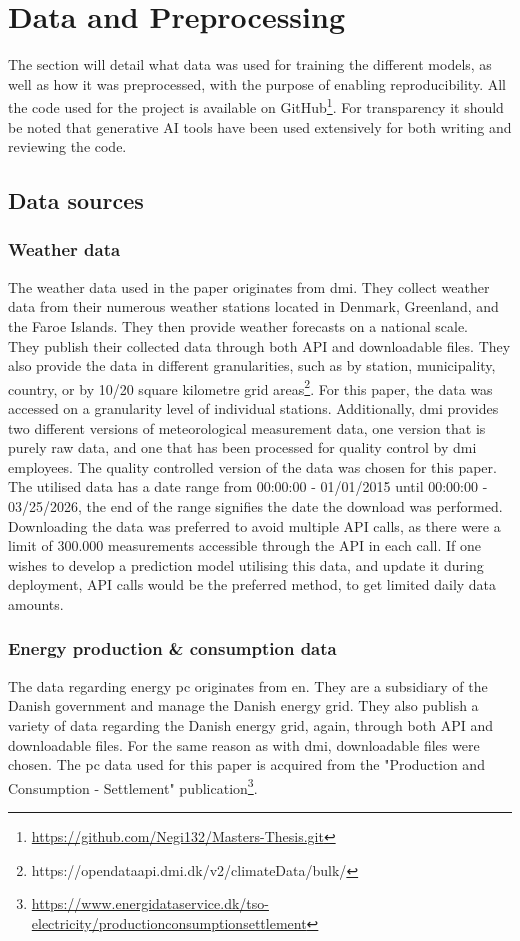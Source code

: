 \section{Data and Preprocessing}\label{sec:data_preprocessing}
The section will detail what data was used for training the different models, 
as well as how it was preprocessed, with the purpose of enabling 
reproducibility. All the code used for the project is available on 
GitHub\footnote{\url{https://github.com/Negi132/Masters-Thesis.git}}.
 For transparency it should be noted that 
generative AI tools have been used extensively for both writing and reviewing 
the code. 
\subsection{Data sources}\label{sec:data_sources}
\subsubsection{Weather data}
The weather data used in the paper originates from \gls{dmi}. They collect 
weather data from their numerous weather stations located in Denmark, 
Greenland, and the Faroe Islands. They then provide weather forecasts on a 
national scale. \\
They publish their collected data through both API and downloadable files. They 
also provide the data in different granularities, such as by station, 
municipality, country, or by 10/20 square kilometre grid 
areas\footnote{https://opendataapi.dmi.dk/v2/climateData/bulk/}. For this 
paper, the data was accessed on a granularity level of individual stations. 
Additionally, \gls{dmi} provides two different versions of meteorological 
measurement data, one 
version that is purely raw data, and one that has been processed for quality 
control by \gls{dmi} employees. The quality controlled version of the data was 
chosen for this paper. The utilised data has a 
date range from 00:00:00 - 
01/01/2015 until 00:00:00 - 
03/25/2026, the end of the range signifies the date the download was performed. 
Downloading the data was preferred to avoid multiple API calls, as there were a 
limit of $300.000$ measurements accessible through the API in each call. If one 
wishes to develop a prediction model utilising 
this data, and update it during 
deployment, API calls would be the preferred method, to get limited daily data 
amounts. 

\subsubsection{Energy production \& consumption data}
The data regarding energy \gls{pc} originates from 
\gls{en}. They are a subsidiary of the Danish 
government and manage the Danish 
energy grid. They also publish a variety of data 
regarding the Danish energy 
grid, again, through both API and downloadable files. For the same reason as 
with \gls{dmi}, downloadable files were chosen. The \gls{pc} data used for this 
paper is acquired from the "Production and Consumption - Settlement" 
publication\footnote{\url{https://www.energidataservice.dk/tso-electricity/productionconsumptionsettlement}}.

